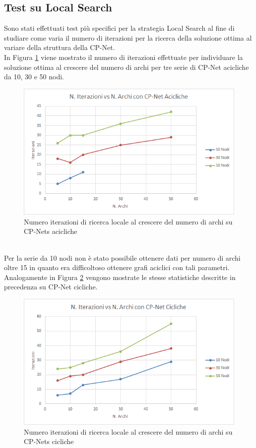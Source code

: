 \documentclass[a4paper,titlepage]{article}
\begin{document}
\subsection{Test su Local Search}
Sono stati effettuati test più specifici per la strategia Local Search al fine di studiare come varia il numero di iterazioni per la ricerca della soluzione ottima al variare della struttura della CP-Net.\\
In Figura \ref{fig:test9} viene mostrato il numero di iterazioni effettuate per individuare la soluzione ottima al crescere del numero di archi per tre serie di CP-Net acicliche da 10, 30 e 50 nodi.
\begin{figure}[!h]
\centering
\includegraphics[scale=0.75]{../img/IterazioniAciclica.png}
\caption{Numero iterazioni di ricerca locale al crescere del numero di archi su CP-Nets acicliche}\label{fig:test9}
\end{figure}
\\Per la serie da 10 nodi non è stato possibile ottenere dati per numero di archi oltre 15 in quanto era difficoltoso ottenere grafi aciclici con tali parametri.\\
Analogamente in Figura \ref{fig:test10} vengono mostrate le stesse statistiche descritte in precedenza su CP-Net cicliche.
\begin{figure}[!h]
\centering
\includegraphics[scale=0.75]{../img/IterazioniCicliche.png}
\caption{Numero iterazioni di ricerca locale al crescere del numero di archi su CP-Nets cicliche}\label{fig:test10}
\end{figure}
\end{document}
